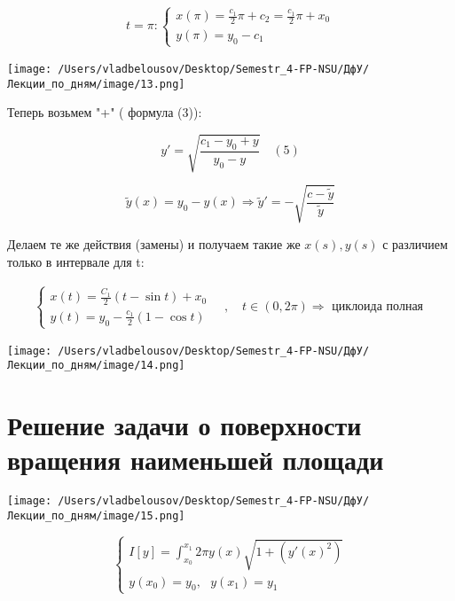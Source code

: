 \documentclass[12pt, a4paper]{report}
\begin{document}
\[ \begin{aligned}
    t= \pi: 
    \begin{cases}
        x(\pi ) = \frac{c_1}{2 }  \pi + c_2= \frac{c_1}{2 } \pi + x_0  \\
        y(\pi) = y_0 - c_1
    \end{cases}
\end{aligned} \] 

\begin{center}
    \texttt{[image: /Users/vladbelousov/Desktop/Semestr\_4-FP-NSU/ДфУ/Лекции\_по\_дням/image/13.png]}
\end{center}

Теперь возьмем "+" ( формула (3)): 

\[ y ' = \sqrt{\frac{ c_1 - y_0 + y }{y_0 - y } }\quad (5 ) \] 

\[ \tilde{y } (x ) = y_0 - y (x ) \Rightarrow \tilde{y } ' = - \sqrt{\frac{ c- \tilde{ y } }{\tilde{y }}}   \]  

Делаем те же действия (замены) и получаем такие же \( x(s), y ( s ) \) с различием только в интервале для t: 

\[ \begin{aligned}
    \begin{cases}
        x(t)  = \frac{C_1}{ 2 }  ( t- \sin t ) + x_0 \\
        y(t ) = y_0 - \frac{c_1}{2 }  ( 1- \cos  t )            
    \end{cases}
    \quad ,\quad t \in ( 0 , 2 \pi ) \Rightarrow \text{ циклоида полная }  
\end{aligned} \]  

\begin{center}
    \texttt{[image: /Users/vladbelousov/Desktop/Semestr\_4-FP-NSU/ДфУ/Лекции\_по\_дням/image/14.png]}
\end{center}

\newpage

\section{Решение задачи о поверхности вращения наименьшей площади}

\begin{center}
    \texttt{[image: /Users/vladbelousov/Desktop/Semestr\_4-FP-NSU/ДфУ/Лекции\_по\_дням/image/15.png]}
\end{center}

\[ \begin{cases}
I[ y ] = \int_{x_0}^{x_1} 2 \pi y(x )  \sqrt{1 + (y '(x ) ^2 )} \\ 
y( x_0 ) = y_0 , \text{ }  y ( x_1 ) = y_1 
\end{cases} \] 
\end{document}
